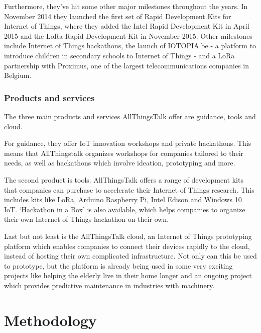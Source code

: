 \documentclass[pdftex,a4paper,12pt,twoside]{report}
\begin{document}
Furthermore, they've hit some other major milestones throughout the years. In November 2014 they launched the first set of Rapid Development Kits for Internet of Things, where they added the Intel Rapid Development Kit in April 2015 and the LoRa Rapid Development Kit in November 2015. Other milestones include Internet of Things hackathons, the launch of IOTOPIA.be - a platform to introduce children in secondary schools to Internet of Things - and a LoRa partnership with Proximus, one of the largest telecommunications companies in Belgium.

\subsection{Products and services}
\label{subsec:attproductsservices}
The three main products and services AllThingsTalk offer are guidance, tools and cloud. 

For guidance, they offer IoT innovation workshops and private hackathons. This means that AllThingstalk organizes workshops for companies tailored to their needs, as well as hackathons which involve ideation, prototyping and more.

The second product is tools. AllThingsTalk offers a range of development kits that companies can purchase to accelerate their Internet of Things research. This includes kits like LoRa, Arduino Raspberry Pi, Intel Edison and Windows 10 IoT. `Hackathon in a Box' is also available, which helps companies to organize their own Internet of Things hackathon on their own.

Last but not least is the AllThingsTalk cloud, an Internet of Things prototyping platform which enables companies to connect their devices rapidly to the cloud, instead of hosting their own complicated infrastructure. Not only can this be used to prototype, but the platform is already being used in some very exciting projects like helping the elderly live in their home longer and an ongoing project which provides predictive maintenance in industries with machinery.


\chapter{Methodology}
\label{ch:methodology}
\end{document}
